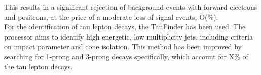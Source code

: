 This results in a significant rejection of background events with forward electrons and positrons, at the price of a moderate loss of signal events, O(\%).   \\


For the identification of tau lepton decays, the TauFinder \cite{} has been used. The processor aims to identify high energetic, low multiplicity jets, including criteria on impact parameter and cone isolation. This method has been improved by searching for 1-prong and 3-prong decays specifically, which account for X\% of the tau lepton decays.
